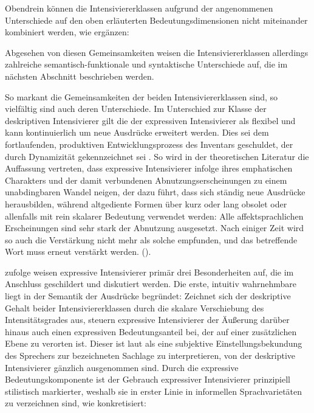 \ea  \label{gramo1}
 \z
 \z
Obendrein können die Intensiviererklassen aufgrund der angenommenen Unterschiede auf den oben erläuterten Bedeutungsdimensionen nicht miteinander kombiniert werden, wie \citet[151]{Gutzmann.2012} ergänzen:

\ea  \label{gramo2}
 \z
 \z

Abgesehen von diesen Gemeinsamkeiten weisen die Intensiviererklassen allerdings zahlreiche semantisch-funktionale und syntaktische Unterschiede auf, die im nächsten Abschnitt beschrieben werden.


So markant die Gemeinsamkeiten der beiden Intensiviererklassen sind, so vielfältig sind auch deren Unterschiede. Im Unterschied zur Klasse der deskriptiven Intensivierer gilt die der expressiven Intensivierer als flexibel und kann kontinuierlich um neue Ausdrücke erweitert werden. Dies sei dem fortlaufenden, produktiven Entwicklungsprozess des Inventars geschuldet, der durch Dynamizität gekennzeichnet sei \citep[vgl.][650]{Bussmann.2002}. So wird in der theoretischen Literatur die Auffassung vertreten, dass expressive Intensivierer infolge ihres emphatischen Charakters und der damit verbundenen Abnutzungserscheinungen zu einem unabdingbaren Wandel neigen, der dazu führt, dass sich ständig neue Ausdrücke herausbilden, während altgediente Formen über kurz oder lang obsolet oder allenfalls mit rein skalarer Bedeutung verwendet werden: \glqq{}Alle affektsprachlichen Erscheinungen sind sehr stark der Abnutzung ausgesetzt. \textelp{} Nach einiger Zeit wird so auch die Verstärkung nicht mehr als solche empfunden, und das betreffende Wort muss erneut verstärkt werden.\grqq{} ({\citealt[87]{Lipka.1966}}).

\citet[19f.]{Gutzmann.2019a} zufolge weisen expressive Intensivierer primär drei Besonderheiten auf, die im Anschluss geschildert und diskutiert werden. Die erste, intuitiv wahrnehmbare liegt in der Semantik der Ausdrücke begründet: Zeichnet sich der deskriptive Gehalt beider Intensiviererklassen durch die skalare Verschiebung des Intensitätsgrades aus, steuern expressive Intensivierer der Äußerung darüber hinaus auch einen expressiven Bedeutungsanteil bei, der auf einer zusätzlichen Ebene zu verorten ist. Dieser ist laut {\citet[133]{Gutzmann.2019a}} als eine subjektive Einstellungsbekundung des Sprechers zur bezeichneten Sachlage zu interpretieren, von der deskriptive Intensivierer gänzlich ausgenommen sind. Durch die expressive Bedeutungskomponente ist der Gebrauch expressiver Intensivierer prinzipiell stilistisch markierter, weshalb sie in erster Linie in informellen Sprachvarietäten zu verzeichnen sind, wie \citet[]{Becher.1907} konkretisiert:

